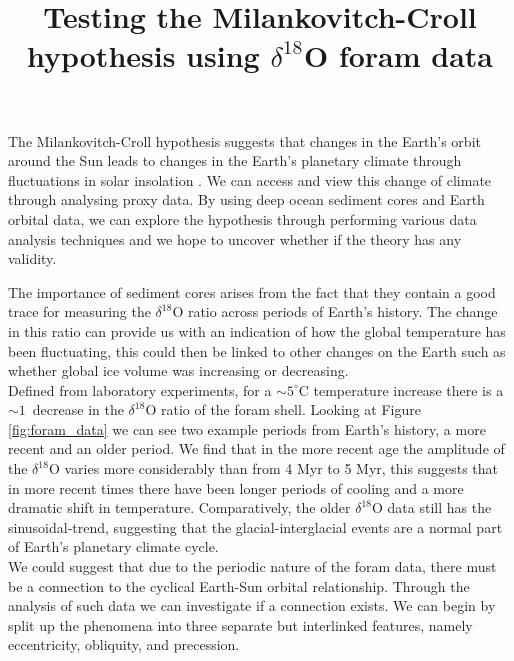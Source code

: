\documentclass[12pt, onecolumn]{revtex4}    %
\begin{document}
                     

\title{Testing the Milankovitch-Croll hypothesis using $\delta^{18}$O foram data} 
\maketitle

\vspace{-4ex}

The Milankovitch-Croll hypothesis suggests that changes in the Earth's orbit around the Sun leads to changes in the Earth's planetary climate through fluctuations in solar insolation \cite{ruddiman_climate}. We can access and view this change of climate through analysing proxy data. By using deep ocean sediment cores and Earth orbital data, we can explore the hypothesis through performing various data analysis techniques and we hope to uncover whether if the theory has any validity. 

The importance of sediment cores arises from the fact that they contain a good trace for measuring the $\delta^{18}$O ratio across periods of Earth's history. The change in this ratio can provide us with an indication of how the global temperature has been fluctuating, this could then be linked to other changes on the Earth such as whether global ice volume was increasing or decreasing. \\

Defined from laboratory experiments, for a $\sim 5^{\circ}\mathrm{C}$ temperature increase there is a $\sim 1$\textperthousand\ decrease in the $\delta^{18}$O ratio of the foram shell. Looking at Figure \ref{fig:foram_data} we can see two example periods from Earth's history, a more recent and an older period. We find that in the more recent age the amplitude of the $\delta^{18}$O varies more considerably than from 4 Myr to 5 Myr, this suggests that in more recent times there have been longer periods of cooling and a more dramatic shift in temperature. Comparatively, the older $\delta^{18}$O data still has the sinusoidal-trend, suggesting that the glacial-interglacial events are a normal part of Earth's planetary climate cycle. \\

We could suggest that due to the periodic nature of the foram data, there must be a connection to the cyclical Earth-Sun orbital relationship. Through the analysis of such data we can investigate if a connection exists. We can begin by split up the phenomena into three separate but interlinked features, namely eccentricity, obliquity, and precession. \\
\end{document}
